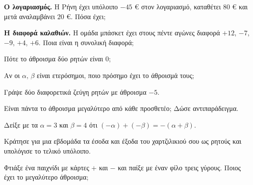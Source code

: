 \ex \textbf{Ο λογαριασμός.} Η Ρήνη έχει υπόλοιπο $-45$ € στον λογαριασμό, καταθέτει $80$ € και μετά αναλαμβάνει $20$ €. Πόσα έχει;

\ex \textbf{Η διαφορά καλαθιών.} Η ομάδα μπάσκετ έχει στους πέντε αγώνες διαφορά $+12$, $-7$, $-9$, $+4$, $+6$. Ποια είναι η συνολική διαφορά;


\ex Πότε το άθροισμα δύο ρητών είναι $0$;

\ex Αν οι $\alpha,\,\beta$ είναι ετερόσημοι, ποιο πρόσημο έχει το άθροισμά τους;

\ex Γράψε δύο διαφορετικά ζεύγη ρητών με άθροισμα $-5$.

\ex Είναι πάντα το άθροισμα μεγαλύτερο από κάθε προσθετέο; Δώσε αντιπαράδειγμα.

\ex Δείξε με τα $\alpha=3$ και $\beta=4$ ότι $(-\alpha)+(-\beta)=-(\alpha+\beta)$.


\ex Κράτησε για μια εβδομάδα τα έσοδα και έξοδα του χαρτζιλικιού σου ως ρητούς και υπολόγισε το τελικό υπόλοιπο.

\ex Φτιάξε ένα παιχνίδι με κάρτες $+$ και $-$ και παίξε με έναν φίλο τρεις γύρους. Ποιος έχει το μεγαλύτερο άθροισμα;
